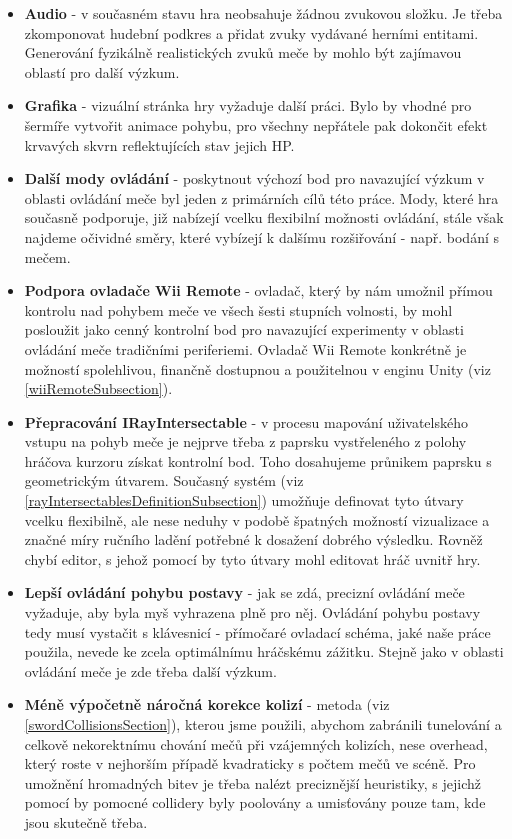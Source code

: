 \begin{itemize}
    \item \textbf{Audio} - v současném stavu hra neobsahuje žádnou zvukovou složku. Je třeba zkomponovat hudební podkres a přidat zvuky vydávané herními entitami. Generování fyzikálně realistických zvuků meče by mohlo být zajímavou oblastí pro další výzkum. 
    \item \textbf{Grafika} - vizuální stránka hry vyžaduje další práci. Bylo by vhodné pro šermíře vytvořit animace pohybu, pro všechny nepřátele pak dokončit efekt krvavých skvrn reflektujících stav jejich \acs{HP}.
    \item \textbf{Další mody ovládání} - poskytnout výchozí bod pro navazující výzkum v oblasti ovládání meče byl jeden z primárních cílů této práce. Mody, které hra současně podporuje, již nabízejí vcelku flexibilní možnosti ovládání, stále však najdeme očividné směry, které vybízejí k dalšímu rozšiřování - např. bodání s mečem. 
    \item \textbf{Podpora ovladače Wii Remote} - ovladač, který by nám umožnil přímou kontrolu nad pohybem meče ve všech šesti stupních volnosti, by mohl posloužit jako cenný kontrolní bod pro navazující experimenty v oblasti ovládání meče tradičními periferiemi. Ovladač Wii Remote konkrétně je možností spolehlivou, finančně dostupnou a použitelnou v enginu Unity (viz \ref{wiiRemoteSubsection}).
    \item \textbf{Přepracování IRayIntersectable} - v procesu mapování uživatelského vstupu na pohyb meče je nejprve třeba z paprsku vystřeleného z polohy hráčova kurzoru získat kontrolní bod. Toho dosahujeme průnikem paprsku s geometrickým útvarem. Současný systém (viz \ref{rayIntersectablesDefinitionSubsection}) umožňuje definovat tyto útvary vcelku flexibilně, ale nese neduhy v podobě špatných možností vizualizace a značné míry ručního ladění potřebné k dosažení dobrého výsledku. Rovněž chybí editor, s jehož pomocí by tyto útvary mohl editovat hráč uvnitř hry.
    \item \textbf{Lepší ovládání pohybu postavy} - jak se zdá, precizní ovládání meče vyžaduje, aby byla myš vyhrazena plně pro něj. Ovládání pohybu postavy tedy musí vystačit s klávesnicí - přímočaré ovladací schéma, jaké naše práce použila, nevede ke zcela optimálnímu hráčskému zážitku. Stejně jako v oblasti ovládání meče je zde třeba další výzkum.
    \item \textbf{Méně výpočetně náročná korekce kolizí} - metoda (viz \ref{swordCollisionsSection}), kterou jsme použili, abychom zabránili tunelování a celkově nekorektnímu chování mečů při vzájemných kolizích, nese overhead, který roste v nejhorším případě kvadraticky s počtem mečů ve scéně. Pro umožnění hromadných bitev je třeba nalézt preciznější heuristiky, s jejichž pomocí by pomocné collidery byly poolovány a umisťovány pouze tam, kde jsou skutečně třeba.

\end{itemize}
